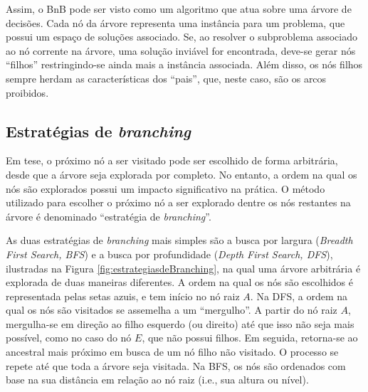 {Assim, o BnB pode ser visto como um algoritmo que atua sobre uma árvore de decisões. Cada nó da árvore representa uma instância para um problema, que possui um espaço de soluções associado. Se, ao resolver o subproblema associado ao nó corrente na árvore, uma solução inviável for encontrada, deve-se gerar nós ``filhos'' restringindo-se ainda mais a instância associada. Além disso, os nós filhos sempre herdam as características dos ``pais'', que, neste caso, são os arcos proibidos.


\subsection{Estratégias de \textit{branching}}

Em tese, o próximo nó a ser visitado pode ser escolhido de forma arbitrária, desde que a árvore seja explorada por completo. No entanto, a ordem na qual os nós são explorados possui um impacto significativo na prática. O método utilizado para escolher o próximo nó a ser explorado dentre os nós restantes na árvore é denominado ``estratégia de \textit{branching}''. 

As duas estratégias de \textit{branching} mais simples são a busca por largura (\textit{Breadth First Search, BFS}) e a busca por profundidade (\textit{Depth First Search, DFS}), ilustradas na Figura \ref{fig:estrategiasdeBranching}, na qual uma árvore arbitrária é explorada de duas maneiras diferentes. A ordem na qual os nós são escolhidos é representada pelas setas azuis, e tem início no nó raiz $A$. Na DFS, a ordem na qual os nós são visitados se assemelha a um ``mergulho''. A partir do nó raiz $A$, mergulha-se em direção ao filho esquerdo (ou direito) até que isso não seja mais possível, como no caso do nó $E$, que não possui filhos. Em seguida, retorna-se ao ancestral mais próximo em busca de um nó filho não visitado. O processo se repete até que toda a árvore seja visitada. Na BFS, os nós são ordenados com base na sua distância em relação ao nó raiz (i.e., sua altura ou nível).

\begin{figure}[t]
	\centering
    \subfloat[DFS]{
			\scalebox{0.95}{
	\begin{tikzpicture}


\end{tikzpicture}}}
\end{figure}}
